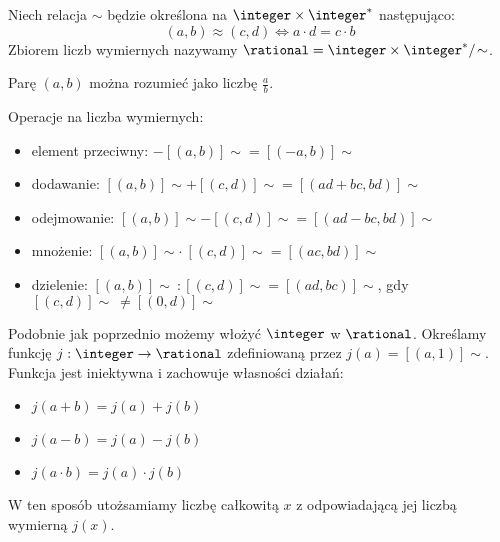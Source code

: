 \begin{definition}
    Niech relacja \( \sim \) będzie określona na \( \integer \times \integer^{*} \) następująco:
    \[
        (a, b) \approx (c, d) \iff a \cdot d = c \cdot b
    \]
    Zbiorem liczb wymiernych nazywamy \( \rational = \integer \times \integer^{*} /\!\sim \).
\end{definition}
Parę \( (a, b) \) można rozumieć jako liczbę \( \frac{a}{b} \).

Operacje na liczba wymiernych:
\begin{itemize}
    \item element przeciwny: \( -[(a, b)]\!\sim = [(-a, b)]\!\sim \)
    \item dodawanie: \( [(a, b)]\!\sim + [(c, d)]\!\sim = [(ad + bc, bd)]\!\sim \)
    \item odejmowanie: \( [(a, b)]\!\sim - [(c, d)]\!\sim = [(ad - bc, bd)]\!\sim \)
    \item mnożenie: \( [(a, b)]\!\sim \cdot\: [(c, d)]\!\sim = [(ac, bd)]\!\sim \)
    \item dzielenie: \( [(a, b)]\!\sim \:: [(c, d)]\!\sim = [(ad, bc)]\!\sim \), gdy \( [(c, d)]\!\sim \:\ne [(0, d)]\!\sim \)
\end{itemize}


Podobnie jak poprzednio możemy włożyć \( \integer \) w \( \rational \). Określamy funkcję \( j : \integer \rightarrow \rational \) zdefiniowaną przez \( j(a) = [(a, 1)]\!\sim \).
Funkcja jest iniektywna i zachowuje własności działań:
\begin{itemize}
    \item \( j(a + b) = j(a) + j(b) \)
    \item \( j(a - b) = j(a) - j(b) \)
    \item \( j(a \cdot b) = j(a) \cdot j(b) \)
\end{itemize}
W ten sposób utożsamiamy liczbę całkowitą \( x \) z odpowiadającą jej liczbą wymierną \( j(x) \).